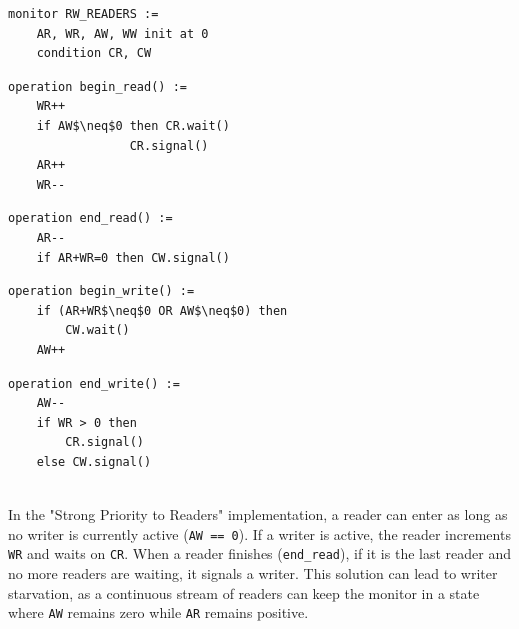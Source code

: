 \begin{minipage}{\textwidth}
\begin{lstlisting}[mathescape]
monitor RW_READERS :=
    AR, WR, AW, WW init at 0
    condition CR, CW
\end{lstlisting}
\begin{minipage}{0.45\textwidth}
\begin{lstlisting}[mathescape]
operation begin_read() :=
    WR++
    if AW$\neq$0 then CR.wait()
                 CR.signal()
    AR++
    WR--
\end{lstlisting}
\end{minipage}
\hfill
\begin{minipage}{0.45\textwidth}
\begin{lstlisting}[mathescape]
operation end_read() :=
    AR--
    if AR+WR=0 then CW.signal()
\end{lstlisting}
\end{minipage}
\begin{minipage}{0.45\textwidth}
\begin{lstlisting}[mathescape]
operation begin_write() :=
    if (AR+WR$\neq$0 OR AW$\neq$0) then
        CW.wait()
    AW++
\end{lstlisting}
\end{minipage}
\hfill
\begin{minipage}{0.45\textwidth}
\begin{lstlisting}[mathescape]
operation end_write() :=
    AW--
    if WR > 0 then
        CR.signal()
    else CW.signal()
\end{lstlisting}
\end{minipage}
\end{minipage}\\

In the "Strong Priority to Readers" implementation, a reader can enter as long as no writer is currently active (\texttt{AW == 0}). If a writer is active, the reader increments \texttt{WR} and waits on \texttt{CR}. When a reader finishes (\texttt{end\_read}), if it is the last reader and no more readers are waiting, it signals a writer. This solution can lead to writer starvation, as a continuous stream of readers can keep the monitor in a state where \texttt{AW} remains zero while \texttt{AR} remains positive.

